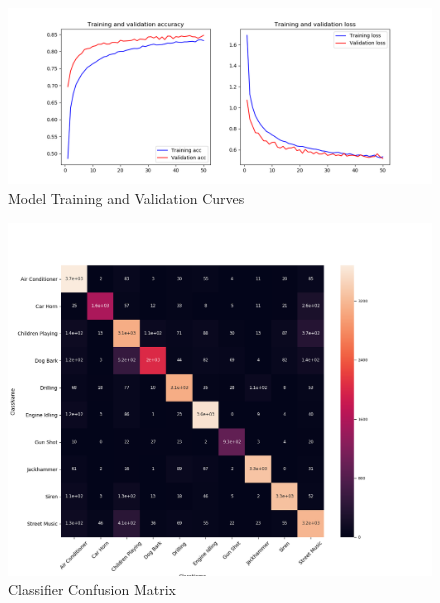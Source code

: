 \begin{Schunk}
\begin{figure}[H]

{\centering \includegraphics[width=1\linewidth]{../images/Audio_DNN_train_val_curves} 

}

\caption[Model Training and Validation Curves]{Model Training and Validation Curves}\label{fig:loss}
\end{figure}
\end{Schunk}

\begin{Schunk}
\begin{figure}[H]

{\centering \includegraphics[width=1\linewidth]{../images/Audio_DNN_heatmap} 

}

\caption[Classifier Confusion Matrix]{Classifier Confusion Matrix}\label{fig:heat}
\end{figure}
\end{Schunk}

